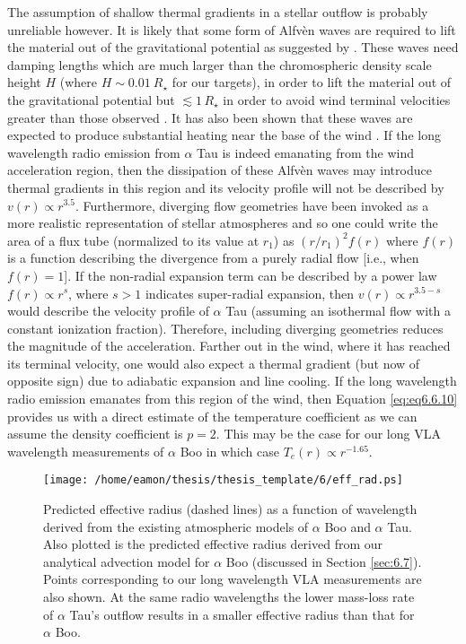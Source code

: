 The assumption of shallow thermal gradients in a stellar outflow is probably unreliable however. It is likely that some form of Alfv\`{e}n waves are required to lift the material out of the gravitational potential as suggested by \cite{hartmann_1980}. These waves need damping lengths which are much larger than the chromospheric density scale height $H$ (where $H \sim 0.01\ R_{\star}$ for our targets), in order to lift the material out of the gravitational potential but $\lesssim 1 \, R_{\star}$ in order to avoid wind terminal velocities greater than those observed \citep[e.g.][]{holzer_1983}. It has also been shown that these waves are expected to produce substantial heating near the base of the wind \citep[e.g.][]{hartmann_1982}. If the long wavelength radio emission from $\alpha$ Tau is indeed emanating from the wind acceleration region, then the dissipation of these Alfv\`{e}n waves may introduce thermal gradients in this region and its velocity profile will not be described by $v(r) \propto r^{3.5}$. Furthermore, diverging flow geometries have been invoked as a more realistic representation of stellar atmospheres \citep{hartmann_1982,jatenco_1989,vidotto_2006} and so one could write the area of a flux tube (normalized to its value at $r_{1}$) as $(r/r_{1})^2f(r)$ where $f(r)$ is a function describing the divergence from a purely radial flow [i.e., when $f(r)=1$].  If the non-radial expansion term can be described by a power law $f(r) \propto r^s$, where $s>1$ indicates super-radial expansion, then $v(r) \propto r^{3.5-s}$ would describe the velocity profile of $\alpha$ Tau (assuming an isothermal flow with a constant ionization fraction). Therefore, including diverging geometries reduces the magnitude of the acceleration. Farther out in the wind, where it has reached its terminal velocity, one would also expect a thermal gradient (but now of opposite sign) due to adiabatic expansion and line cooling. If the long wavelength radio emission emanates from this region of the wind, then Equation \ref{eq:eq6.6.10} provides us with a direct estimate of the temperature coefficient as we can assume the density coefficient is $p=2$. This may be the case for our long VLA wavelength measurements of $\alpha$ Boo in which case $T_{e}(r) \propto r^{-1.65}$.

\begin{figure}[hbt!]
\centering 
          \texttt{[image: /home/eamon/thesis/thesis\_template/6/eff\_rad.ps]}
\caption[Predicted effective radius as a function of wavelength]{Predicted effective radius (dashed lines) as a function of wavelength derived from the existing atmospheric models of $\alpha$ Boo and $\alpha$ Tau.  Also plotted is the predicted effective radius derived from our analytical advection model for $\alpha$ Boo (discussed in Section \ref{sec:6.7}). Points corresponding to our long wavelength VLA measurements are also shown. At the same radio wavelengths the lower mass-loss rate of $\alpha$ Tau's outflow results in a smaller effective radius than that for $\alpha$ Boo.}
\label{fig6.6.3}
\end{figure}

